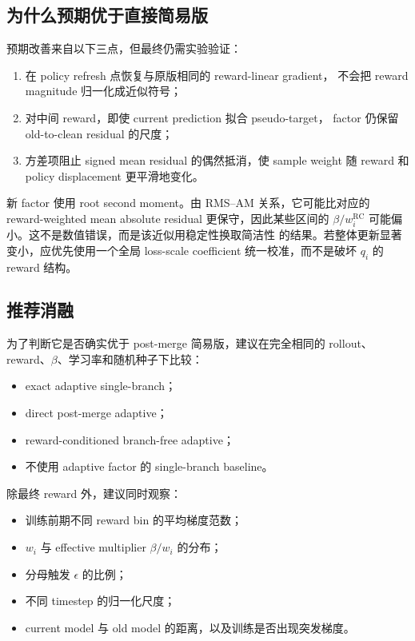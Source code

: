 \documentclass[11pt,a4paper]{article}
\newcommand{\eps}{\epsilon}
\newcommand{\R}{\mathrm{RC}}
\begin{document}
\subsection{为什么预期优于直接简易版}

预期改善来自以下三点，但最终仍需实验验证：
\begin{enumerate}
  \item 在 policy refresh 点恢复与原版相同的 reward-linear gradient，
  不会把 reward magnitude 归一化成近似符号；
  \item 对中间 reward，即使 current prediction 拟合 pseudo-target，
  factor 仍保留 old-to-clean residual 的尺度；
  \item 方差项阻止 signed mean residual 的偶然抵消，使 sample weight
  随 reward 和 policy displacement 更平滑地变化。
\end{enumerate}

新 factor 使用 root second moment。由 RMS--AM 关系，它可能比对应的
reward-weighted mean absolute residual 更保守，因此某些区间的
$\beta/w_i^{\R}$ 可能偏小。这不是数值错误，而是该近似用稳定性换取简洁性
的结果。若整体更新显著变小，应优先使用一个全局 loss-scale coefficient
统一校准，而不是破坏 $q_i$ 的 reward 结构。

\subsection{推荐消融}

为了判断它是否确实优于 post-merge 简易版，建议在完全相同的 rollout、
reward、$\beta$、学习率和随机种子下比较：
\begin{itemize}
  \item exact adaptive single-branch；
  \item direct post-merge adaptive；
  \item reward-conditioned branch-free adaptive；
  \item 不使用 adaptive factor 的 single-branch baseline。
\end{itemize}

除最终 reward 外，建议同时观察：
\begin{itemize}
  \item 训练前期不同 reward bin 的平均梯度范数；
  \item $w_i$ 与 effective multiplier $\beta/w_i$ 的分布；
  \item 分母触发 $\eps$ 的比例；
  \item 不同 timestep 的归一化尺度；
  \item current model 与 old model 的距离，以及训练是否出现突发梯度。
\end{itemize}
\end{document}
